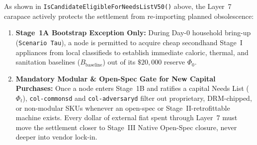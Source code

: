 As shown in \texttt{IsCandidateEligibleForNeedsListV50()} above, the Layer~7 carapace actively protects the settlement from re-importing planned obsolescence:
\begin{enumerate}
    \item \textbf{Stage~1A Bootstrap Exception Only:} During Day-0 household bring-up (\texttt{Scenario Tau}), a node is permitted to acquire cheap secondhand Stage~I appliances from local classifieds to establish immediate caloric, thermal, and sanitation baselines ($B_{\mathrm{baseline}}$) out of its $\$20{,}000$ reserve $\Phi_0$.
    \item \textbf{Mandatory Modular \& Open-Spec Gate for New Capital Purchases:} Once a node enters Stage~1B and ratifies a capital Needs List ($\Phi_t$), \texttt{col-commonsd} and \texttt{col-adversaryd} filter out proprietary, DRM-chipped, or non-modular SKUs whenever an open-spec or Stage~II-retrofittable machine exists. Every dollar of external fiat spent through Layer~7 must move the settlement closer to Stage~III Native Open-Spec closure, never deeper into vendor lock-in.
\end{enumerate}

